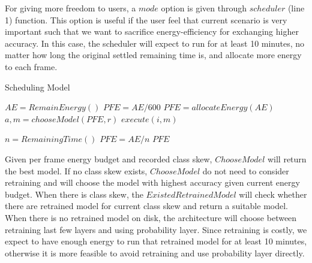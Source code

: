 \documentclass{article}
\begin{document}
For giving more freedom to users, a $mode$ option is given through $scheduler$ (line 1) function. This option is useful if the user feel that current scenario is very important such that we want to sacrifice energy-efficiency for exchanging higher accuracy. In this case, the scheduler will expect to run for at least 10 minutes, no matter how long the original settled remaining time is, and allocate more energy to each frame. 



\begin{algorithm}
 \caption{Scheduling Model}
  \begin{algorithmic}[1]
        \State $AE = RemainEnergy()$    
            \State $PFE = AE / 600 $ 
                \State $PFE = allocateEnergy(AE)$
        \EndIf
            \State $a, m = chooseModel(PFE, r)$  
            \State $execute(i,m)$        
    \EndFunction

        \State $n = RemainingTime()$    
        \State $PFE = AE/n$
        \State \Return $PFE$
    \EndFunction
\end{algorithmic}
\end{algorithm}


Given per frame energy budget and recorded class skew, $ChooseModel$ will return the best model. If no class skew exists, $ChooseModel$ do not need to consider retraining and will choose the model with highest accuracy given current energy budget. When there is class skew, the $ExistedRetrainedModel$ will check whether there are retrained model for current class skew and return a suitable model. When there is no retrained model on disk, the architecture will choose between retraining last few layers and using probability layer. Since retraining is costly, we expect to have enough energy to run that retrained model for at least 10 minutes, otherwise it is more feasible to avoid retraining and use probability layer directly.
\end{document}
